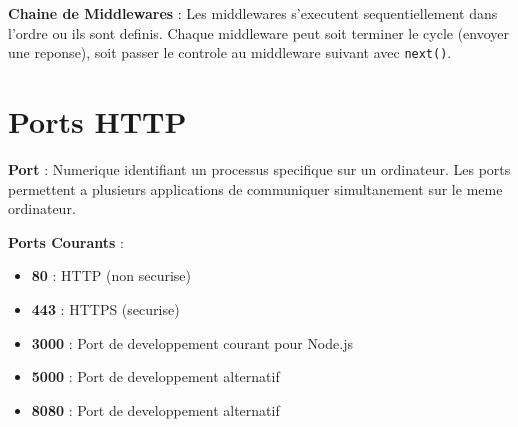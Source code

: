 \documentclass[a4paper,12pt]{book}
\begin{document}
\begin{center}
\end{center}

\begin{architecturebox}
    \textbf{Chaine de Middlewares} : Les middlewares s'executent sequentiellement dans l'ordre ou ils sont definis. Chaque middleware peut soit terminer le cycle (envoyer une reponse), soit passer le controle au middleware suivant avec \texttt{next()}.
\end{architecturebox}

\section{Ports HTTP}

\begin{definitionbox}
    \textbf{Port} : Numerique identifiant un processus specifique sur un ordinateur. Les ports permettent a plusieurs applications de communiquer simultanement sur le meme ordinateur.
\end{definitionbox}

\textbf{Ports Courants} :
\begin{itemize}
    \item \textbf{80} : HTTP (non securise)
    \item \textbf{443} : HTTPS (securise)
    \item \textbf{3000} : Port de developpement courant pour Node.js
    \item \textbf{5000} : Port de developpement alternatif
    \item \textbf{8080} : Port de developpement alternatif
\end{itemize}
\end{document}
